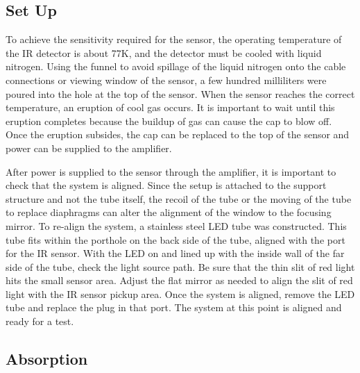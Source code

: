 
\subsection{Set Up}


To achieve the sensitivity required for the sensor, the operating temperature of the IR detector is about 77K, and the detector must be cooled with liquid nitrogen. Using the funnel to avoid spillage of the liquid nitrogen onto the cable connections or viewing window of the sensor, a few hundred milliliters were poured into the hole at the top of the sensor. When the sensor reaches the correct temperature, an eruption of cool gas occurs. It is important to wait until this eruption completes because the buildup of gas can cause the cap to blow off. Once the eruption subsides, the cap can be replaced to the top of the sensor and power can be supplied to the amplifier. 

After power is supplied to the sensor through the amplifier, it is important to check that the system is aligned. Since the setup is attached to the support structure and not the tube itself, the recoil of the tube or the moving of the tube to replace diaphragms can alter the alignment of the window to the focusing mirror. To re-align the system, a stainless steel LED tube was constructed. This tube fits within the porthole on the back side of the tube, aligned with the port for the IR sensor. With the LED on and lined up with the inside wall of the far side of the tube, check the light source path. Be sure that the thin slit of red light hits the small sensor area. Adjust the flat mirror as needed to align the slit of red light with the IR sensor pickup area. Once the system is aligned, remove the LED tube and replace the plug in that port. The system at this point is aligned and ready for a test.  


\subsection{Absorption}

